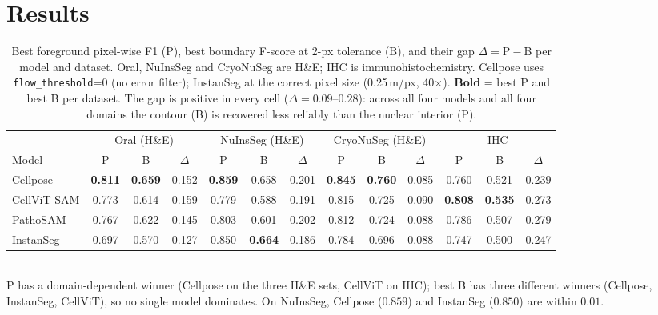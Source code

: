 \documentclass[10pt,conference]{IEEEtran}
\begin{document}
\section{Results}
\label{sec:results}

\begin{table}[t]
\centering
\caption{Best foreground pixel-wise F1 (P), best boundary F-score at 2-px tolerance (B),
and their gap $\Delta=\mathrm{P}-\mathrm{B}$ per model and dataset. Oral, NuInsSeg and
CryoNuSeg are H\&E; IHC is immunohistochemistry. Cellpose uses \texttt{flow\_threshold}=0
(no error filter); InstanSeg at the correct pixel size (0.25\,\textmu m/px, 40$\times$).
\textbf{Bold} = best P and best B per dataset. The gap is positive in every cell
($\Delta=0.09$--$0.28$): across all four models and all four domains the contour (B) is
recovered less reliably than the nuclear interior (P).}
\label{tab:combined}
\begin{tabular}{l ccc ccc ccc ccc}
\toprule
& \multicolumn{3}{c}{Oral (H\&E)} & \multicolumn{3}{c}{NuInsSeg (H\&E)}
& \multicolumn{3}{c}{CryoNuSeg (H\&E)} & \multicolumn{3}{c}{IHC} \\
\cmidrule(lr){2-4}\cmidrule(lr){5-7}\cmidrule(lr){8-10}\cmidrule(lr){11-13}
Model & P & B & $\Delta$ & P & B & $\Delta$ & P & B & $\Delta$ & P & B & $\Delta$ \\
\midrule
Cellpose    & \textbf{0.811} & \textbf{0.659} & 0.152 & \textbf{0.859} & 0.658 & 0.201 & \textbf{0.845} & \textbf{0.760} & 0.085 & 0.760 & 0.521 & 0.239 \\
CellViT-SAM & 0.773 & 0.614 & 0.159 & 0.779 & 0.588 & 0.191 & 0.815 & 0.725 & 0.090 & \textbf{0.808} & \textbf{0.535} & 0.273 \\
PathoSAM    & 0.767 & 0.622 & 0.145 & 0.803 & 0.601 & 0.202 & 0.812 & 0.724 & 0.088 & 0.786 & 0.507 & 0.279 \\
InstanSeg   & 0.697 & 0.570 & 0.127 & 0.850 & \textbf{0.664} & 0.186 & 0.784 & 0.696 & 0.088 & 0.747 & 0.500 & 0.247 \\
\bottomrule
\end{tabular}
\\[3pt]
\footnotesize P has a domain-dependent winner (Cellpose on the three H\&E sets, CellViT on
IHC); best B has three different winners (Cellpose, InstanSeg, CellViT), so no single model
dominates. On NuInsSeg, Cellpose ($0.859$) and InstanSeg ($0.850$) are within $0.01$.
\end{table}
\end{document}
